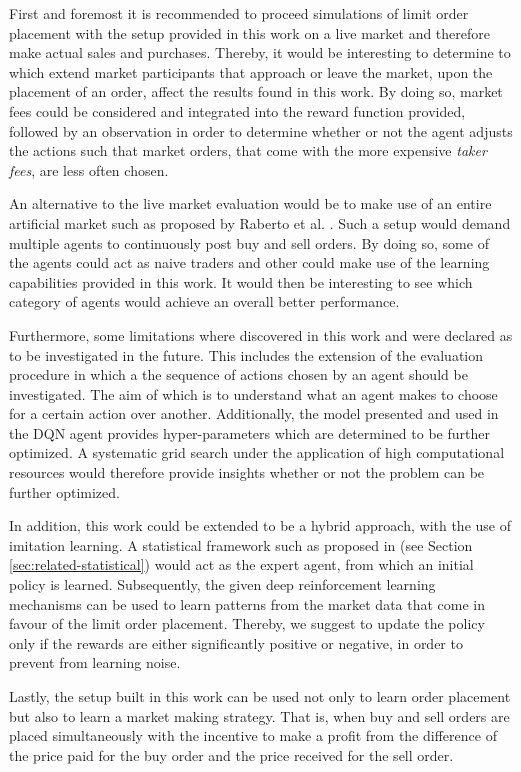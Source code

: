 First and foremost it is recommended to proceed simulations of limit order placement with the setup provided in this work on a live market and therefore make actual sales and purchases.
Thereby, it would be interesting to determine to which extend market participants that approach or leave the market, upon the placement of an order, affect the results found in this work.
By doing so, market fees could be considered and integrated into the reward function provided, followed by an observation in order to determine whether or not the agent adjusts the actions such that market orders, that come with the more expensive \textit{taker fees}, are less often chosen.

An alternative to the live market evaluation would be to make use of an entire artificial market such as proposed by Raberto et al. \cite{raberto2005price}. 
Such a setup would demand multiple agents to continuously post buy and sell orders.
By doing so, some of the agents could act as naive traders and other could make use of the learning capabilities provided in this work.
It would then be interesting to see which category of agents would achieve an overall better performance.

Furthermore, some limitations where discovered in this work and were declared as to be investigated in the future.
This includes the extension of the evaluation procedure in which a the sequence of actions chosen by an agent should be investigated.
The aim of which is to understand what an agent makes to choose for a certain action over another.
Additionally, the model presented and used in the DQN agent provides hyper-parameters which are determined to be further optimized.
A systematic grid search under the application of high computational resources would therefore provide insights whether or not the problem can be further optimized.

In addition, this work could be extended to be a hybrid approach, with the use of imitation learning.
A statistical framework such as proposed in \cite{yingsaeree2012algorithmic} (see Section \ref{sec:related-statistical}) would act as the expert agent, from which an initial policy is learned.
Subsequently, the given deep reinforcement learning mechanisms can be used to learn patterns from the market data that come in favour of the limit order placement.
Thereby, we suggest to update the policy only if the rewards are either significantly positive or negative, in order to prevent from learning noise.

Lastly, the setup built in this work can be used not only to learn order placement but also to learn a market making\cite{o1986microeconomics} strategy.
That is, when buy and sell orders are placed simultaneously with the incentive to make a profit from the difference of the price paid for the buy order and the price received for the sell order.

